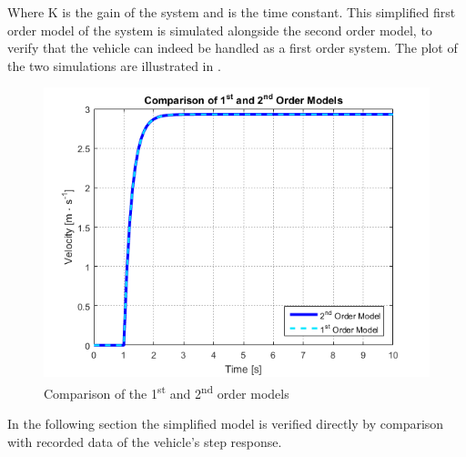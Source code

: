 %
Where \si{K} is the gain of the system and \si{\tau} is the time constant. This simplified first order model of the system is simulated alongside the second order model, to verify that the vehicle can indeed be handled as a first order system. The plot of the two simulations are illustrated in .
%
\begin{figure}[H]
	\centering
	\includegraphics[width = .8\textwidth]{figures/ComparisonOf1stAnd2ndOrderModels.png}
	\caption{Comparison of the \si{1^{st}} and \si{2^{nd}} order models}
	\label{fig:ComparisonOf1stAnd2ndOrderModels}
\end{figure}
%

In the following section the simplified model is verified directly by comparison with recorded data of the vehicle's step response.